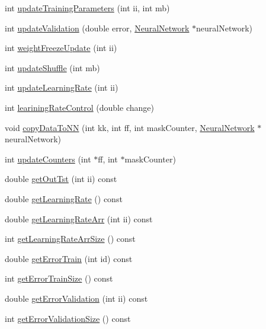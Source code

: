 \begin{DoxyCompactItemize}
int \hyperlink{classTrainingAlgorithm_ab851f054fd5d2e8841e01a5f580f2732}{update\+Training\+Parameters} (int ii, int mb)
\item 
int \hyperlink{classTrainingAlgorithm_ad2f5c257023e633ec41113d249c43ba6}{update\+Validation} (double error, \hyperlink{classNeuralNetwork}{Neural\+Network} $\ast$neural\+Network)
\item 
int \hyperlink{classTrainingAlgorithm_abc1b34e633f7e8dd99a6e35240fdce83}{weight\+Freeze\+Update} (int ii)
\item 
int \hyperlink{classTrainingAlgorithm_ab26a602d2459842b11bb37c35a3fb59a}{update\+Shuffle} (int mb)
\item 
int \hyperlink{classTrainingAlgorithm_a52c9b99dcf9bcf1ddd32450672e706bf}{update\+Learning\+Rate} (int ii)
\item 
int \hyperlink{classTrainingAlgorithm_aca653a3e888ee8e5f4084617f2bc5a9d}{learining\+Rate\+Control} (double change)
\item 
void \hyperlink{classTrainingAlgorithm_a8be859e1ba4f6021f117898f17f2dff1}{copy\+Data\+To\+NN} (int kk, int ff, int mask\+Counter, \hyperlink{classNeuralNetwork}{Neural\+Network} $\ast$neural\+Network)
\item 
int \hyperlink{classTrainingAlgorithm_ae12d856f083e41259724bad87cc52626}{update\+Counters} (int $\ast$ff, int $\ast$mask\+Counter)
\item 
double \hyperlink{classTrainingAlgorithm_a1d8fe723cbbee0957952efe26b3e924c}{get\+Out\+Tst} (int ii) const 
\item 
double \hyperlink{classTrainingAlgorithm_a60bcfabab30187a4383772c645751b8b}{get\+Learning\+Rate} () const 
\item 
double \hyperlink{classTrainingAlgorithm_afb4f0fd58ae4728e54f4142dbcbcb93f}{get\+Learning\+Rate\+Arr} (int ii) const 
\item 
int \hyperlink{classTrainingAlgorithm_a318302372014d527da236a422dae285c}{get\+Learning\+Rate\+Arr\+Size} () const 
\item 
double \hyperlink{classTrainingAlgorithm_a93545fcc39bad8ea91d308de3f459bf3}{get\+Error\+Train} (int id) const 
\item 
int \hyperlink{classTrainingAlgorithm_a3bc47eea4ef973100277fecced49a28e}{get\+Error\+Train\+Size} () const 
\item 
double \hyperlink{classTrainingAlgorithm_ad1daaf48f27b0a0c311818c400e4e85c}{get\+Error\+Validation} (int ii) const 
\item 
int \hyperlink{classTrainingAlgorithm_a3c3dacccaefdf289a130d0ab32dee305}{get\+Error\+Validation\+Size} () const 

\end{DoxyCompactItemize}
